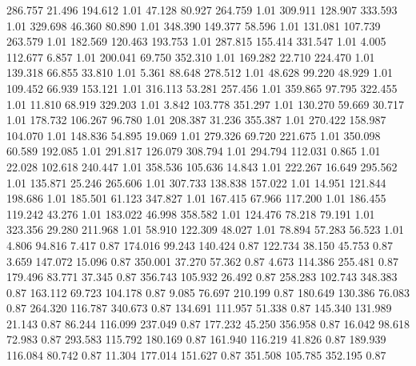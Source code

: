  286.757   21.496  194.612         1.01
  47.128   80.927  264.759         1.01
 309.911  128.907  333.593         1.01
 329.698   46.360   80.890         1.01
 348.390  149.377   58.596         1.01
 131.081  107.739  263.579         1.01
 182.569  120.463  193.753         1.01
 287.815  155.414  331.547         1.01
   4.005  112.677    6.857         1.01
 200.041   69.750  352.310         1.01
 169.282   22.710  224.470         1.01
 139.318   66.855   33.810         1.01
   5.361   88.648  278.512         1.01
  48.628   99.220   48.929         1.01
 109.452   66.939  153.121         1.01
 316.113   53.281  257.456         1.01
 359.865   97.795  322.455         1.01
  11.810   68.919  329.203         1.01
   3.842  103.778  351.297         1.01
 130.270   59.669   30.717         1.01
 178.732  106.267   96.780         1.01
 208.387   31.236  355.387         1.01
 270.422  158.987  104.070         1.01
 148.836   54.895   19.069         1.01
 279.326   69.720  221.675         1.01
 350.098   60.589  192.085         1.01
 291.817  126.079  308.794         1.01
 294.794  112.031    0.865         1.01
  22.028  102.618  240.447         1.01
 358.536  105.636   14.843         1.01
 222.267   16.649  295.562         1.01
 135.871   25.246  265.606         1.01
 307.733  138.838  157.022         1.01
  14.951  121.844  198.686         1.01
 185.501   61.123  347.827         1.01
 167.415   67.966  117.200         1.01
 186.455  119.242   43.276         1.01
 183.022   46.998  358.582         1.01
 124.476   78.218   79.191         1.01
 323.356   29.280  211.968         1.01
  58.910  122.309   48.027         1.01
  78.894   57.283   56.523         1.01
   4.806   94.816    7.417         0.87
 174.016   99.243  140.424         0.87
 122.734   38.150   45.753         0.87
   3.659  147.072   15.096         0.87
 350.001   37.270   57.362         0.87
   4.673  114.386  255.481         0.87
 179.496   83.771   37.345         0.87
 356.743  105.932   26.492         0.87
 258.283  102.743  348.383         0.87
 163.112   69.723  104.178         0.87
   9.085   76.697  210.199         0.87
 180.649  130.386   76.083         0.87
 264.320  116.787  340.673         0.87
 134.691  111.957   51.338         0.87
 145.340  131.989   21.143         0.87
  86.244  116.099  237.049         0.87
 177.232   45.250  356.958         0.87
  16.042   98.618   72.983         0.87
 293.583  115.792  180.169         0.87
 161.940  116.219   41.826         0.87
 189.939  116.084   80.742         0.87
  11.304  177.014  151.627         0.87
 351.508  105.785  352.195         0.87
